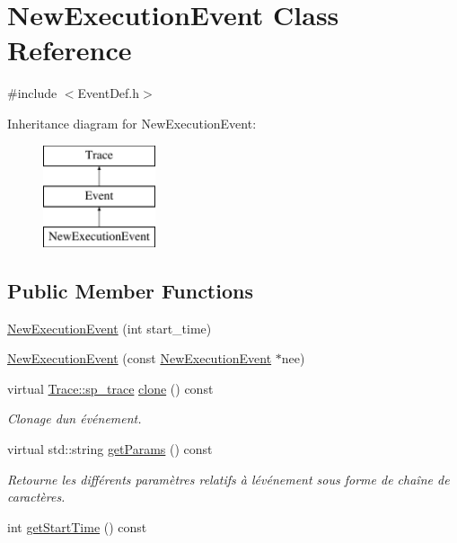 \hypertarget{class_new_execution_event}{}\section{New\+Execution\+Event Class Reference}
\label{class_new_execution_event}


{\ttfamily \#include $<$Event\+Def.\+h$>$}

Inheritance diagram for New\+Execution\+Event\+:\begin{figure}[H]
\begin{center}
\leavevmode
\includegraphics[height=3.000000cm]{class_new_execution_event}
\end{center}
\end{figure}
\subsection*{Public Member Functions}
\begin{DoxyCompactItemize}
\item 
\hyperlink{class_new_execution_event_ae957f1481d67e50e6816b38c03debecf}{New\+Execution\+Event} (int start\+\_\+time)
\item 
\hyperlink{class_new_execution_event_a84fae0b583bd7692a70c34ead8f19e50}{New\+Execution\+Event} (const \hyperlink{class_new_execution_event}{New\+Execution\+Event} $\ast$nee)
\item 
virtual \hyperlink{class_trace_a9c58e523529fc8a03fb6acf3eef86150}{Trace\+::sp\+\_\+trace} \hyperlink{class_new_execution_event_adc75351c4c45e5161c26138b29e980ed}{clone} () const 
\begin{DoxyCompactList}\small\item\em Clonage d\textquotesingle{}un événement. \end{DoxyCompactList}\item 
virtual std\+::string \hyperlink{class_new_execution_event_a1d28826bae4c7b73bc85859f62f48a48}{get\+Params} () const 
\begin{DoxyCompactList}\small\item\em Retourne les différents paramètres relatifs à l\textquotesingle{}événement sous forme de chaîne de caractères. \end{DoxyCompactList}\item 
int \hyperlink{class_new_execution_event_a677aa6cf9f100dd4522b6e467c264030}{get\+Start\+Time} () const 
\end{DoxyCompactItemize}
